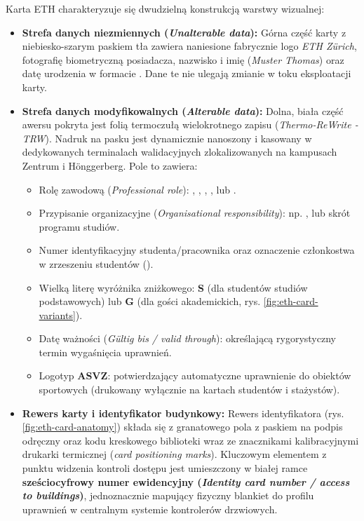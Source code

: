 Karta ETH charakteryzuje się dwudzielną konstrukcją warstwy wizualnej:
\begin{itemize}
    \item \textbf{Strefa danych niezmiennych (\textit{Unalterable data}):} Górna część karty z niebiesko-szarym paskiem tła zawiera naniesione fabrycznie logo \textit{ETH Zürich}, fotografię biometryczną posiadacza, nazwisko i imię (\textit{Muster Thomas}) oraz datę urodzenia w formacie . Dane te nie ulegają zmianie w toku eksploatacji karty.
    \item \textbf{Strefa danych modyfikowalnych (\textit{Alterable data}):} Dolna, biała część awersu pokryta jest folią termoczułą wielokrotnego zapisu (\textit{Thermo-ReWrite - TRW}). Nadruk na pasku jest dynamicznie nanoszony i kasowany w dedykowanych terminalach walidacyjnych zlokalizowanych na kampusach Zentrum i Hönggerberg. Pole to zawiera:
    \begin{itemize}
        \item Rolę zawodową (\textit{Professional role}): , , , ,  lub .
        \item Przypisanie organizacyjne (\textit{Organisational responsibility}): np. ,  lub skrót programu studiów.
        \item Numer identyfikacyjny studenta/pracownika oraz oznaczenie członkostwa w zrzeszeniu studentów ().
        \item Wielką literę wyróżnika zniżkowego: \textbf{S} (dla studentów studiów podstawowych) lub \textbf{G} (dla gości akademickich, rys. \ref{fig:eth-card-variants}).
        \item Datę ważności (\textit{Gültig bis / valid through}): określającą rygorystyczny termin wygaśnięcia uprawnień.
        \item Logotyp \textbf{ASVZ}: potwierdzający automatyczne uprawnienie do obiektów sportowych (drukowany wyłącznie na kartach studentów i stażystów).
    \end{itemize}
    \item \textbf{Rewers karty i identyfikator budynkowy:} Rewers identyfikatora (rys. \ref{fig:eth-card-anatomy}) składa się z granatowego pola z paskiem na podpis odręczny oraz kodu kreskowego biblioteki wraz ze znacznikami kalibracyjnymi drukarki termicznej (\textit{card positioning marks}). Kluczowym elementem z punktu widzenia kontroli dostępu jest umieszczony w białej ramce \textbf{sześciocyfrowy numer ewidencyjny (\textit{Identity card number / access to buildings})}, jednoznacznie mapujący fizyczny blankiet do profilu uprawnień w centralnym systemie kontrolerów drzwiowych.
\end{itemize}

